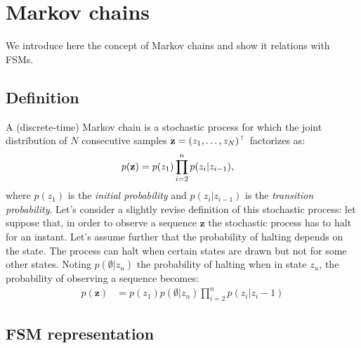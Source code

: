 \section{Markov chains}
\label{sec:markovchains}

We introduce here the concept of Markov chains and show it relations
with FSMs.

\subsection{Definition}

A (discrete-time) Markov chain is a stochastic process for which the
joint distribution of $N$ consecutive samples
$\boldsymbol{\mathbf{z}} = (z_1, \dots, z_N)^\top$ factorizes as:
\begin{align}
    p(\boldsymbol{\mathbf{z}}) &= p(z_1)\prod_{i=2}^n p(z_i | z_{i-1}),
    \label{eq:markovchains:infinite_markovchain}
\end{align}
where $p(z_1)$ is the \emph{initial probability} and $p(z_i | z_{i-1})$
is the \emph{transition probability}. Let's consider a slightly revise
definition of this stochastic process: let suppose that, in order to
observe a sequence $\mathbf{z}$ the stochastic process has to halt
for an instant. Let's assume further that the probability of halting
depends on the state. The process can halt when certain states are
drawn but not for some other states. Noting $p(\emptyset | z_n)$ the
probability of halting when in state $z_n$, the probability of
observing a sequence becomes:
\begin{align}
    p(\mathbf{z}) &= p(z_1) p(\emptyset | z_n) \prod_{i=2}^n p(z_i | z_i-1)
    \label{eq:markovchains:finite_markovchain}
\end{align}

\subsection{FSM representation}

